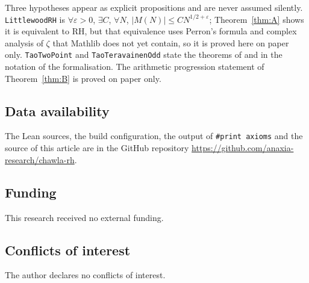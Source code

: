 \documentclass[11pt]{amsart}
\numberwithin{equation}{section}
\theoremstyle{plain}
\theoremstyle{definition}
\theoremstyle{remark}
\newcommand{\lean}[1]{\texttt{#1}}
\begin{document}
Three hypotheses appear as explicit propositions and are never assumed silently. \lean{LittlewoodRH} is $\forall\varepsilon>0$, $\exists C$, $\forall N$, $|M(N)|\le CN^{1/2+\varepsilon}$; Theorem~\ref{thm:A} shows it is equivalent to RH, but that equivalence uses Perron's formula and complex analysis of $\zeta$ that Mathlib does not yet contain, so it is proved here on paper only. \lean{TaoTwoPoint} and \lean{TaoTeravainenOdd} state the theorems of \cite{Tao16} and \cite{TT18,TT19} in the notation of the formalisation. The arithmetic progression statement of Theorem~\ref{thm:B} is proved on paper only.

\subsection*{Data availability}
The Lean sources, the build configuration, the output of \texttt{\#print axioms} and the source of this article are in the GitHub repository \url{https://github.com/anaxia-research/chawla-rh}.

\subsection*{Funding}
This research received no external funding.

\subsection*{Conflicts of interest}
The author declares no conflicts of interest.
\end{document}
